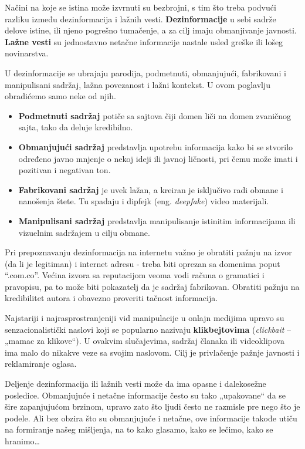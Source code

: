 \documentclass[a4paper]{article}
\begin{document}
Načini na koje se istina može izvrnuti su bezbrojni, s tim što treba podvući razliku između dezinformacija i lažnih vesti. \newline \textbf{Dezinformacije} u sebi sadrže delove istine, ili njeno pogrešno tumačenje, a za cilj imaju obmanjivanje javnosti. \newline \textbf{Lažne vesti} su jednostavno netačne informacije nastale usled greške ili lošeg novinarstva.    


U dezinformacije se ubrajaju parodija, podmetnuti, obmanjujući, fabrikovani i manipulisani sadržaj, lažna povezanost i lažni kontekst. U ovom poglavlju obradićemo samo neke od njih.


\begin{itemize}
    \item \textbf{Podmetnuti sadržaj} potiče sa sajtova čiji domen liči na domen zvaničnog sajta, tako da deluje kredibilno.
    \item \textbf{Obmanjujući sadržaj} predstavlja upotrebu informacija kako bi se stvorilo određeno javno mnjenje o nekoj ideji ili javnoj ličnosti, pri čemu može imati i pozitivan i negativan ton.
    \item \textbf{Fabrikovani sadržaj} je uvek lažan, a kreiran je isključivo radi obmane i nanošenja štete. Tu spadaju i dipfejk \cite{deepfake} (eng. \emph{deepfake}) video materijali.
    \item \textbf{Manipulisani sadržaj} predstavlja manipulisanje istinitim informacijama ili vizuelnim sadržajem u cilju obmane.
\end{itemize}


Pri prepoznavanju dezinformacija na internetu važno je obratiti pažnju na izvor (da li je legitiman) i internet adresu - treba biti oprezan sa domenima poput “.com.co”. Većina izvora sa reputacijom veoma vodi računa o gramatici i pravopisu, pa to može biti pokazatelj da je sadržaj fabrikovan. Obratiti pažnju na kredibilitet autora i obavezno proveriti tačnost informacija.


Najstariji i najrasprostranjeniji vid manipulacije u onlajn medijima upravo su 
senzacionalistički naslovi koji se popularno nazivaju \textbf{klikbejtovima} \cite{clickbait} (\emph{clickbait} – „mamac za klikove“). U ovakvim slučajevima, sadržaj članaka ili videoklipova ima malo do nikakve veze sa svojim naslovom. Cilj je privlačenje pažnje javnosti i reklamiranje oglasa. 


Deljenje dezinformacija ili lažnih vesti može da ima opasne i dalekosežne 
posledice. Obmanjujuće i netačne informacije često su tako „upakovane“ da se šire zapanjujućom brzinom, upravo zato što ljudi često ne razmisle pre nego što je podele. \newline
Ali bez obzira što su obmanjujuće i netačne, ove informacije takođe utiču na 
formiranje našeg mišljenja, na to kako glasamo, kako se lečimo, kako se hranimo… 
\end{document}
